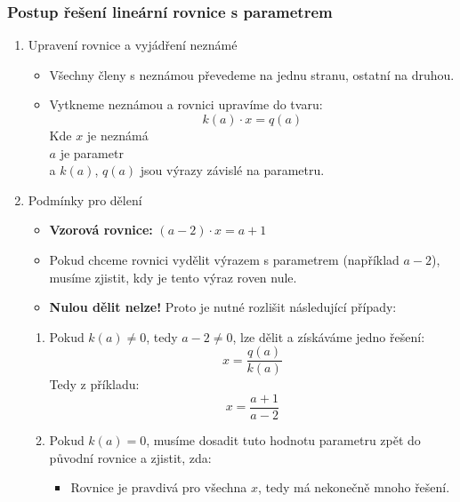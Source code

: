         \subsubsection{Postup řešení lineární rovnice s parametrem}
\begin{enumerate}
    \item Upravení rovnice a vyjádření neznámé
        \begin{itemize}
            \item Všechny členy s neznámou převedeme na jednu stranu, ostatní na druhou.
            \item Vytkneme neznámou a rovnici upravíme do tvaru:\\
            $$
            k(a)\cdot x=q(a)
            $$
            Kde $x$ je neznámá\\
            $a$ je parametr\\
            a $k(a)$, $q(a)$ jsou výrazy závislé na parametru.
        \end{itemize}
    \item Podmínky pro dělení
        \begin{itemize}
             \item 
               \textbf{Vzorová rovnice:} $(a-2)\cdot x=a+1$\\
            \item
            Pokud chceme rovnici vydělit výrazem s parametrem (například $a-2$), musíme zjistit, kdy je tento výraz roven nule.
            \item \textbf{Nulou dělit nelze!} 
            Proto je nutné rozlišit následující případy:
        \end{itemize}   
                \begin{enumerate}
                        \item Pokud $k(a)\not=0$, tedy $a-2\not=0$, lze dělit a získáváme jedno řešení:
                        $$
                         x=\frac{q(a)}{k(a)}
                        $$
                        Tedy z příkladu:
                        $$
                        x=\frac{a+1}{a-2}
                        $$
                        \item Pokud $k(a)=0$, musíme dosadit tuto hodnotu parametru zpět do původní rovnice a zjistit, zda:
                            \begin{itemize}
                                \item Rovnice je pravdivá pro všechna $x$, tedy má nekonečně mnoho řešení.\\ 

\end{itemize}
\end{enumerate}
\end{enumerate}
